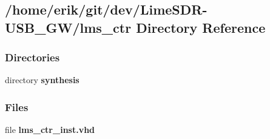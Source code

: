 \subsection{/home/erik/git/dev/\+Lime\+S\+D\+R-\/\+U\+S\+B\+\_\+\+G\+W/lms\+\_\+ctr Directory Reference}
\label{dir_3e6d25e5d141ce3eddaf8639d35fb15c}
\subsubsection*{Directories}
\begin{DoxyCompactItemize}
\item 
directory {\bf synthesis}
\end{DoxyCompactItemize}
\subsubsection*{Files}
\begin{DoxyCompactItemize}
\item 
file {\bf lms\+\_\+ctr\+\_\+inst.\+vhd}
\end{DoxyCompactItemize}
